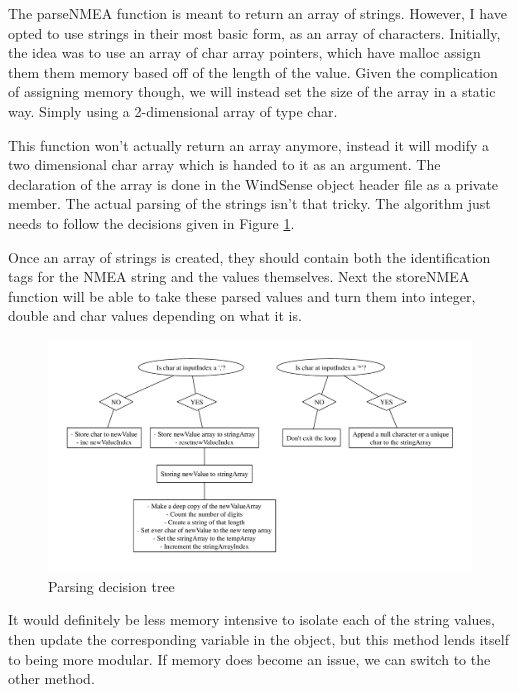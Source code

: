 \documentclass[letterpaper]{article}
\begin{document}
The parseNMEA function is meant to return an array of strings. However, I have opted to use strings in their most basic form, as an array of characters. Initially, the idea was to use an array of char array pointers, which have malloc assign them them memory based off of the length of the value. Given the complication of assigning memory though, we will instead set the size of the array in a static way. Simply using a 2-dimensional array of type char. 

This function won't actually return an array anymore, instead it will modify a two dimensional char array which is handed to it as an argument. The declaration of the array is done in the WindSense object header file as a private member. The actual parsing of the strings isn't that tricky. The algorithm just needs to follow the decisions given in Figure \ref{fig:parsingTree}. 

Once an array of strings is created, they should contain both the identification tags for the NMEA string and the values themselves. Next the storeNMEA function will be able to take these parsed values and turn them into integer, double and char values depending on what it is.

\begin{figure}[h]
	\centering
	\includegraphics[width=\linewidth]{maps/parsing.pdf}
	\caption{Parsing decision tree}
	\label{fig:parsingTree}
\end{figure}

It would definitely be less memory intensive to isolate each of the string values, then update the corresponding variable in the object, but this method lends itself to being more modular. If memory does become an issue, we can switch to the other method.
\end{document}
